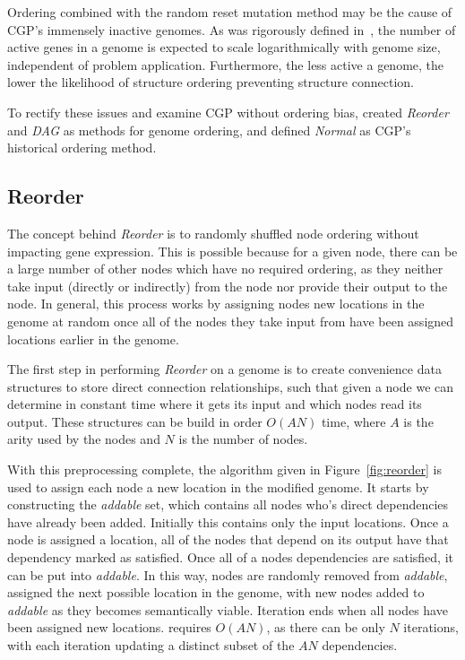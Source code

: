 \documentclass[journal]{IEEEtran}
\begin{document}
Ordering combined with the random reset mutation method may be the cause of CGP's
immensely inactive genomes.  As was rigorously defined in~\cite{goldman:2013:ordering},
the number of active genes in a genome is expected to scale logarithmically
with genome size, independent of problem application.  Furthermore, the less
active a genome, the lower the likelihood of structure ordering preventing structure
connection.

To rectify these issues and examine CGP without ordering bias, \cite{goldman:2013:ordering}
created \emph{Reorder} and \emph{DAG} as methods for genome ordering, and defined
\emph{Normal} as CGP's historical ordering method.

\subsection{Reorder}
\label{sec:reorder}
The concept behind \emph{Reorder} is to randomly shuffled node ordering without
impacting gene expression.  This is possible because for a given node, there can
be a large number of other nodes which have no required ordering,
as they neither take input (directly or indirectly) from the node nor provide their
output to the node.  In general, this process works by assigning nodes new
locations in the genome at random once all of the nodes they take input from have been assigned
locations earlier in the genome.

The first step in performing \emph{Reorder} on a genome is to create convenience
data structures to store direct connection relationships, such that given a node
we can determine in constant time where it gets its input and which nodes read
its output.  These structures can be build in order $O(AN)$ time, where $A$ is the arity used by the nodes
and $N$ is the number of nodes.

With this preprocessing complete, the  algorithm given in Figure~\ref{fig:reorder}
is used to assign each node a new location in the modified genome.
It starts by constructing the \emph{addable} set, which contains all nodes who's direct
dependencies have already been added.  Initially this contains only the input locations.
Once a node is assigned a location, all of the nodes that depend on its output
have that dependency marked as satisfied.  Once all of a nodes dependencies
are satisfied, it can be put into \emph{addable}.  In this way, nodes are
randomly removed from \emph{addable}, assigned the next possible location
in the genome, with new nodes added to \emph{addable} as they becomes semantically
viable.  Iteration ends when all nodes have been assigned new locations.
 requires $O(AN)$, as there can be only $N$ iterations,
with each iteration updating a distinct subset of the $AN$ dependencies.
\end{document}

